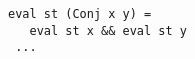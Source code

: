 

\begin{figure}[!t]
  \centering
  \begin{minipage}{0.8\textwidth}
    \begin{lstlisting}[frame=tb]   
 eval st (Conj x y) =
   eval st x && eval st y
 ...
    \end{lstlisting}
  \end{minipage}
\end{figure}
